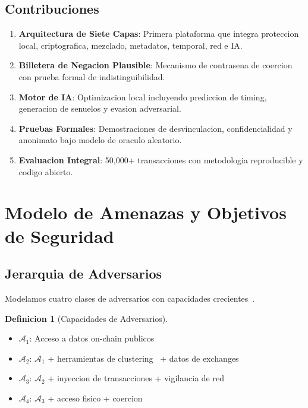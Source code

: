 \documentclass[11pt]{article}
\theoremstyle{definition}
\newtheorem{definicion}{Definicion}[section]
\theoremstyle{plain}
\theoremstyle{remark}
\begin{document}
\subsection{Contribuciones}

\begin{enumerate}[label=\textbf{C\arabic*:}]
    \item \textbf{Arquitectura de Siete Capas}: Primera plataforma que integra proteccion local, criptografica, mezclado, metadatos, temporal, red e IA.
    
    \item \textbf{Billetera de Negacion Plausible}: Mecanismo de contrasena de coercion con prueba formal de indistinguibilidad.
    
    \item \textbf{Motor de IA}: Optimizacion local incluyendo prediccion de timing, generacion de senuelos y evasion adversarial.
    
    \item \textbf{Pruebas Formales}: Demostraciones de desvinculacion, confidencialidad y anonimato bajo modelo de oraculo aleatorio.
    
    \item \textbf{Evaluacion Integral}: 50,000+ transacciones con metodologia reproducible y codigo abierto.
\end{enumerate}

\section{Modelo de Amenazas y Objetivos de Seguridad}
\label{sec:threats}

\subsection{Jerarquia de Adversarios}

Modelamos cuatro clases de adversarios con capacidades crecientes~\cite{narayanan2016bitcoin}.

\begin{definicion}[Capacidades de Adversarios]
\begin{itemize}
    \item $\mathcal{A}_1$: Acceso a datos on-chain publicos
    \item $\mathcal{A}_2$: $\mathcal{A}_1$ + herramientas de clustering~\cite{chainalysis2023} + datos de exchanges
    \item $\mathcal{A}_3$: $\mathcal{A}_2$ + inyeccion de transacciones + vigilancia de red
    \item $\mathcal{A}_4$: $\mathcal{A}_3$ + acceso fisico + coercion
\end{itemize}
\end{definicion}
\end{document}
